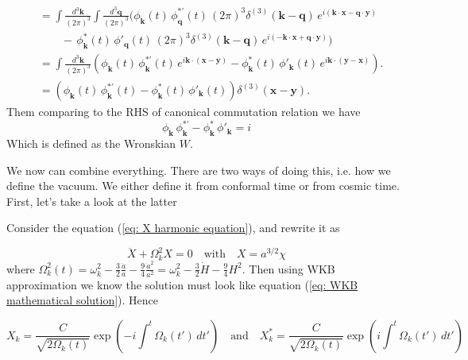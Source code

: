 \begin{align*}
    &=\int \frac{d^3 \mathbf{k}}{(2\pi)^3} \int \frac{d^3 \mathbf{q}}{(2\pi)^3}
    \Big( \phi_{\mathbf{k}}(t)\,\phi_{\mathbf{q}}^{*\prime}(t)\,
    (2\pi)^3 \delta^{(3)}(\mathbf{k}-\mathbf{q})\,
    e^{i(\mathbf{k}\cdot\mathbf{x} - \mathbf{q}\cdot\mathbf{y})} \\
    &\qquad
    -\, \phi_{\mathbf{k}}^*(t)\,\phi'_{\mathbf{q}}(t)\,
    (2\pi)^3 \delta^{(3)}(\mathbf{k}-\mathbf{q})\,
    e^{i(-\mathbf{k}\cdot\mathbf{x} + \mathbf{q}\cdot\mathbf{y})} \Big) \\
    &= \int \frac{d^3 \mathbf{k}}{(2\pi)^3}
    \left( \phi_{\mathbf{k}}(t)\,\phi_{\mathbf{k}}^{*\prime}(t)\,
    e^{i\mathbf{k}\cdot(\mathbf{x}-\mathbf{y})} - \phi_{\mathbf{k}}^*(t)\,\phi'_{\mathbf{k}}(t)\, e^{i\mathbf{k}\cdot(\mathbf{y}-\mathbf{x})}
    \right). \\
    &=\left( \phi_{\mathbf{k}}(t)\,\phi_{\mathbf{k}}^{*\prime}(t) - \phi_{\mathbf{k}}^*(t)\,\phi'_{\mathbf{k}}(t) \right) \delta^{(3)}(\mathbf{x} - \mathbf{y}).
\end{align*}
Them comparing to the RHS of canonical commutation relation we have
\begin{equation}\label{eq: wronskian}
    \phi_{\mathbf{k}}\,\phi_{\mathbf{k}}^{*\prime} - \phi_{\mathbf{k}}^*\,\phi'_{\mathbf{k}} = i
\end{equation}
Which is defined as the Wronskian $W$. 

We now can combine everything. There are two ways of doing this, i.e. how we define the vacuum. We either define it from conformal time or from cosmic time. First, let's take a look at the latter

Consider the equation (\ref{eq: X harmonic equation}), and rewrite it as

\begin{equation*}
    \ddot{X} + \Omega^2_k X = 0 \quad \text{with} \quad X = a^{3/2} \chi
\end{equation*}
where $\Omega^2_k(t) = \omega^2_k - \frac{3}{2} \frac{\ddot{a}}{a} - \frac{9}{4} \frac{\dot{a}^2}{a^2} = \omega^2_k - \frac{3}{2} \dot{H} - \frac{9}{4} H^2$. Then using WKB approximation we know the solution must look like equation (\ref{eq: WKB mathematical solution}). Hence

\begin{equation*}
    X_k = \frac{C}{\sqrt{2\Omega_k(t)}} \exp\left(-i \int^{t} \Omega_k(t')\,dt'\right) \quad \text{and} \quad X_k^* = \frac{C}{\sqrt{2\Omega_k(t)}} \exp\left(i \int^{t} \Omega_k(t')\,dt'\right)
\end{equation*}

